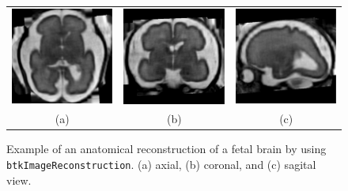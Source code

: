 \begin{description}
\begin{figure}[t]
\centering
\begin{tabular}{ccc}
\includegraphics[width=0.3\columnwidth]{hr_axl.eps}&
\includegraphics[width=0.3\columnwidth]{hr_cor.eps}&
\includegraphics[width=0.3\columnwidth]{hr_sag.eps}\\
{(a)}&{(b)}&{(c)}\\
\end{tabular}
\caption{Example of an anatomical reconstruction of a fetal brain by using
\texttt{btkImageReconstruction}. (a) axial, (b) coronal, and (c) sagital view.}
\label{fig:reconstruction}
\end{figure}


\end{description}
